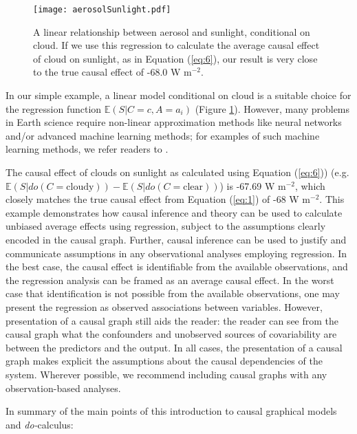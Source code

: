\documentclass[12pt]{article}
\begin{document}
\begin{figure} \centering \texttt{[image: aerosolSunlight.pdf]}
  \caption{A linear relationship between aerosol and sunlight,
    conditional on cloud. If we use this regression to calculate the
    average causal effect of cloud on sunlight, as in Equation
    (\ref{eq:6}), our result is very close to the true causal effect
    of -68.0 W m$^{-2}$.}
  \label{fig:linear}
\end{figure}

In our simple example, a linear model conditional on cloud is a
suitable choice for the regression function
$\mathbb{E}(S | C=c, A=a_i)$ (Figure \ref{fig:linear}). However, many
problems in Earth science require non-linear approximation methods
like neural networks and/or advanced machine learning methods; for
examples of such machine learning methods, we refer readers to
\citep{bishop2006pattern}.

The causal effect of clouds on sunlight as calculated using Equation
(\ref{eq:6})) (e.g.
$\mathbb{E}(S | do(C = \text{cloudy})) - \mathbb{E}(S | do(C =
\text{clear}))$) is -67.69 W m$^{-2}$, which closely matches the true
causal effect from Equation (\ref{eq:1}) of -68 W m$^{-2}$. This
example demonstrates how causal inference and theory can be used to
calculate unbiased average effects using regression, subject to the
assumptions clearly encoded in the causal graph. Further, causal
inference can be used to justify and communicate assumptions in any
observational analyses employing regression. In the best case, the
causal effect is identifiable from the available observations, and the
regression analysis can be framed as an average causal effect. In the
worst case that identification is not possible from the available
observations, one may present the regression as observed associations
between variables. However, presentation of a causal graph still aids
the reader: the reader can see from the causal graph what the
confounders and unobserved sources of covariability are between the
predictors and the output. In all cases, the presentation of a causal
graph makes explicit the assumptions about the causal dependencies of
the system. Wherever possible, we recommend including causal graphs
with any observation-based analyses.

In summary of the main points of this introduction to causal graphical
models and \textit{do-}calculus:
\end{document}
